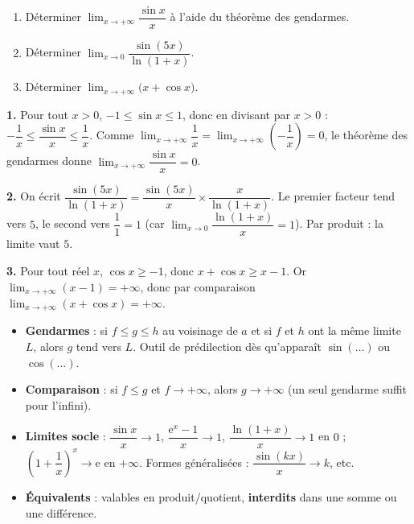 \documentclass[11pt]{article}
\begin{document}
\begin{exercice}
\begin{enumerate}
\item Déterminer $\displaystyle\lim_{x\to +\infty}\dfrac{\sin x}{x}$ à l'aide du théorème des gendarmes.
\item Déterminer $\displaystyle\lim_{x\to 0}\dfrac{\sin(5x)}{\ln(1+x)}$.
\item Déterminer $\displaystyle\lim_{x\to +\infty}\big(x + \cos x\big)$.
\end{enumerate}
\end{exercice}

\begin{corrige}[Exercice n°1]
\textbf{1.} Pour tout $x > 0$, $-1 \le \sin x \le 1$, donc en divisant par $x > 0$ : $-\dfrac{1}{x} \le \dfrac{\sin x}{x} \le \dfrac{1}{x}$. Comme $\lim_{x\to+\infty}\dfrac{1}{x} = \lim_{x\to+\infty}\left(-\dfrac{1}{x}\right) = 0$, le théorème des gendarmes donne $\lim_{x\to+\infty}\dfrac{\sin x}{x} = 0$.

\textbf{2.} On écrit $\dfrac{\sin(5x)}{\ln(1+x)} = \dfrac{\sin(5x)}{x}\times\dfrac{x}{\ln(1+x)}$. Le premier facteur tend vers $5$, le second vers $\dfrac{1}{1} = 1$ (car $\lim_{x\to 0}\dfrac{\ln(1+x)}{x} = 1$). Par produit : la limite vaut $5$.

\textbf{3.} Pour tout réel $x$, $\cos x \ge -1$, donc $x + \cos x \ge x - 1$. Or $\lim_{x\to+\infty}(x-1) = +\infty$, donc par comparaison $\lim_{x\to+\infty}(x+\cos x) = +\infty$.
\end{corrige}

\begin{aretenir}
\begin{itemize}
\item \textbf{Gendarmes} : si $f \le g \le h$ au voisinage de $a$ et si $f$ et $h$ ont la même limite $L$, alors $g$ tend vers $L$. Outil de prédilection dès qu'apparaît $\sin(\ldots)$ ou $\cos(\ldots)$.
\item \textbf{Comparaison} : si $f \le g$ et $f \to +\infty$, alors $g \to +\infty$ (un seul gendarme suffit pour l'infini).
\item \textbf{Limites socle} : $\dfrac{\sin x}{x} \to 1$, $\dfrac{\mathrm{e}^x - 1}{x} \to 1$, $\dfrac{\ln(1+x)}{x} \to 1$ en $0$ ; $\left(1+\dfrac{1}{x}\right)^x \to \mathrm{e}$ en $+\infty$. Formes généralisées : $\dfrac{\sin(kx)}{x} \to k$, etc.
\item \textbf{Équivalents} : valables en produit/quotient, \textbf{interdits} dans une somme ou une différence.
\end{itemize}
\end{aretenir}
\end{document}
